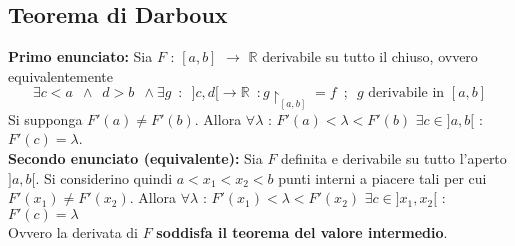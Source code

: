 \documentclass[10pt, oneside]{book}
\theoremstyle{plain}
\begin{document}
\subsection{Teorema di Darboux}
\begin{ther}
    \textbf{Primo enunciato: }Sia $F$ : $[a,b]$ $\rightarrow$ $\mathbb{R}$ derivabile su tutto il chiuso, ovvero equivalentemente
    \[\exists c < a \enspace \land \enspace d > b \enspace \land \exists g \enspace : \enspace ]c,d[ \rightarrow \mathbb{R} \enspace : g \restriction_{[a,b]} = f \enspace ; \enspace g \textrm{ derivabile in } [a,b]\]
    Si supponga $F'(a) \neq F'(b)$. Allora $\forall \lambda$ : $F'(a) < \lambda < F'(b)$ $\exists c \in ]a, b[$ : $F'(c) = \lambda$.
    \\\textbf{Secondo enunciato (equivalente): } Sia $F$ definita e derivabile su tutto l'aperto $]a,b[$. Si considerino quindi $a<x_1 < x_2 < b$ punti interni a piacere tali per cui $F'(x_1) \neq F'(x_2)$. Allora $\forall \lambda$ : $F'(x_1) < \lambda < F'(x_2)$ $\exists c \in ]x_1, x_2[$ : $F'(c) = \lambda$
    \\Ovvero la derivata di $F$ \textbf{soddisfa il teorema del valore intermedio}.
\end{ther}
\end{document}
